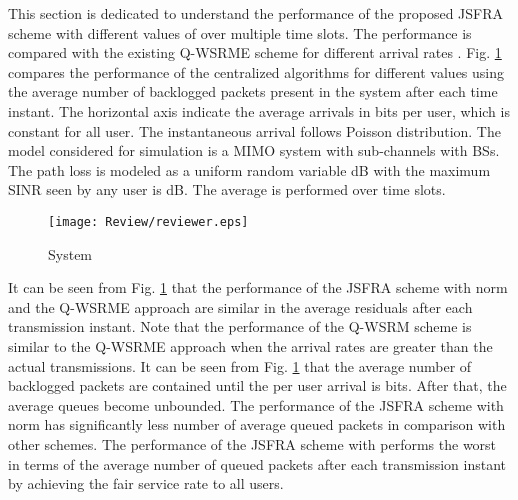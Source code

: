 This section is dedicated to understand the performance of the proposed \ac{JSFRA} scheme with different values of  over multiple time slots. The performance is compared with the existing \ac{Q-WSRME} scheme for different arrival rates . Fig. \ref{fig-review} compares the performance of the centralized algorithms for different  values using the average number of backlogged packets present in the system after each time instant. The horizontal axis indicate the average arrivals in bits per user, which is constant for all user. The instantaneous arrival follows Poisson distribution. The model considered for simulation is a  \ac{MIMO} system with  sub-channels with  \acp{BS}. The path loss is modeled as a uniform random variable \me{[0,-3]} dB with the maximum \ac{SINR} seen by any user is  dB. The average is performed over  time slots.
\begin{figure}
	\centering
	\texttt{[image: Review/reviewer.eps]}
	\label{fig-review}
	\caption{System }
\end{figure}

It can be seen from Fig. \ref{fig-review} that the performance of the \ac{JSFRA} scheme with  norm and the \ac{Q-WSRME} approach are similar in the average residuals after each transmission instant. Note that the performance of the \ac{Q-WSRM} scheme is similar to the \ac{Q-WSRME} approach when the arrival rates are greater than the actual transmissions. It can be seen from Fig. \ref{fig-review} that the average number of backlogged packets are contained until the per user arrival is  bits. After that, the average queues become unbounded. The performance of the \ac{JSFRA} scheme with  norm has significantly less number of average queued packets in comparison with other schemes. The performance of the \ac{JSFRA} scheme with \me{\ell_{\infty}} performs the worst in terms of the average number of queued packets after each transmission instant by achieving the fair service rate to all users.
